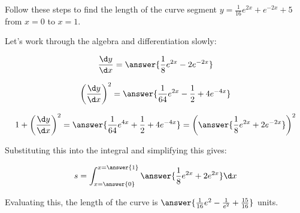 \documentclass{ximera}
\author{Jim Talamo}
\begin{document}
\begin{exercise}

Follow these steps to find the length of the curve segment $y=\frac{1}{16}e^{2x}+e^{-2x}+5$ from $x=0$ to $x=1$.

Let's work through the algebra and differentiation slowly:

\[
\frac{\d y}{\d x} = \answer{\frac{1}{8}e^{2x}-2e^{-2x}}
\]
\begin{exercise}
\[
\left(\frac{\d y}{\d x}\right)^2 = \answer{\frac{1}{64}e^{2x}-\frac{1}{2}+4e^{-4x}}
\]

\begin{exercise}

\[
1+ \left(\frac{\d y}{\d x}\right)^2 = \answer{\frac{1}{64}e^{4x}+\frac{1}{2}+4e^{-4x}} = \left(\answer{\frac{1}{8}e^{2x}+2e^{-2x} }  \right)^2
\]

\begin{exercise}
Substituting this into the integral and simplifying this gives:

\[
s= \int_{x=\answer{0}}^{x=\answer{1}} \answer{\frac{1}{8}e^{2x}+2e^{2x}} \d x 
\]

Evaluating this, the length of the curve is $\answer{\frac{1}{16}e^2-\frac{1}{e^2} +\frac{15}{16} }$ units.

\end{exercise}
\end{exercise}
\end{exercise}



\end{exercise}
\end{document}
